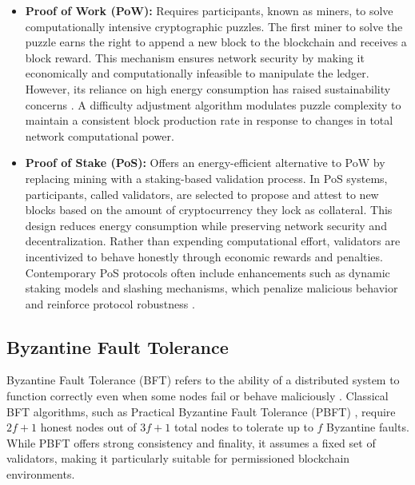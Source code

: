 \documentclass[final]{rc-book-2.14}
\begin{document}
\begin{itemize}

    \item \textbf{Proof of Work (PoW):} Requires participants, known as miners, to solve computationally intensive cryptographic puzzles. The first miner to solve the puzzle earns the right to append a new block to the blockchain and receives a block reward. This mechanism ensures network security by making it economically and computationally infeasible to manipulate the ledger. However, its reliance on high energy consumption has raised sustainability concerns \cite{narayanan2016bitcoin, sedlmeir_energy_2020}. A difficulty adjustment algorithm modulates puzzle complexity to maintain a consistent block production rate in response to changes in total network computational power.

    \item \textbf{Proof of Stake (PoS):} Offers an energy-efficient alternative to PoW by replacing mining with a staking-based validation process. In PoS systems, participants, called validators, are selected to propose and attest to new blocks based on the amount of cryptocurrency they lock as collateral. This design reduces energy consumption while preserving network security and decentralization. Rather than expending computational effort, validators are incentivized to behave honestly through economic rewards and penalties. Contemporary PoS protocols often include enhancements such as dynamic staking models and slashing mechanisms, which penalize malicious behavior and reinforce protocol robustness \cite{kiayias2017}.

\end{itemize}


\subsection{Byzantine Fault Tolerance}

Byzantine Fault Tolerance (BFT) refers to the ability of a distributed system to function correctly even when some nodes fail or behave maliciously \cite{lamport1982byzantine}. Classical BFT algorithms, such as Practical Byzantine Fault Tolerance (PBFT) \cite{castro1999practical}, require \(2f+1\) honest nodes out of \(3f+1\) total nodes to tolerate up to \(f\) Byzantine faults. While PBFT offers strong consistency and finality, it assumes a fixed set of validators, making it particularly suitable for permissioned blockchain environments.
\end{document}
